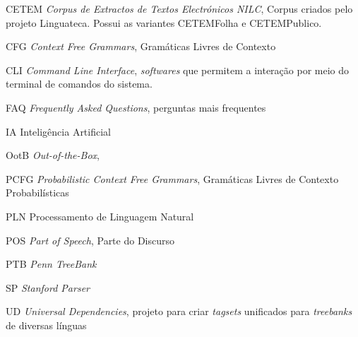 \begin{siglas}  
  \item[CETEM] \textit{Corpus de Extractos de Textos Electrónicos NILC}, Corpus criados pelo projeto Linguateca. Possui as variantes CETEMFolha e CETEMPublico.
  \item[CFG] \textit{Context Free Grammars}, Gramáticas Livres de Contexto
  \item[CLI] \textit{Command Line Interface}, \textit{softwares} que permitem a interação por meio do terminal de comandos do sistema.
  \item[FAQ] \textit{Frequently Asked Questions}, perguntas mais frequentes
  \item[IA] Inteligência Artificial
  \item[OotB] \textit{Out-of-the-Box}, 
  \item[PCFG] \textit{Probabilistic Context Free Grammars}, Gramáticas Livres de Contexto Probabilísticas
  \item[PLN] Processamento de Linguagem Natural
  \item[POS] \textit{Part of Speech}, Parte do Discurso
  \item[PTB] \textit{Penn TreeBank}
  \item[SP] \textit{Stanford Parser}
  \item[UD] \textit{Universal Dependencies}, projeto para criar \textit{tagsets} unificados para \textit{treebanks} de diversas línguas
  
\end{siglas}
